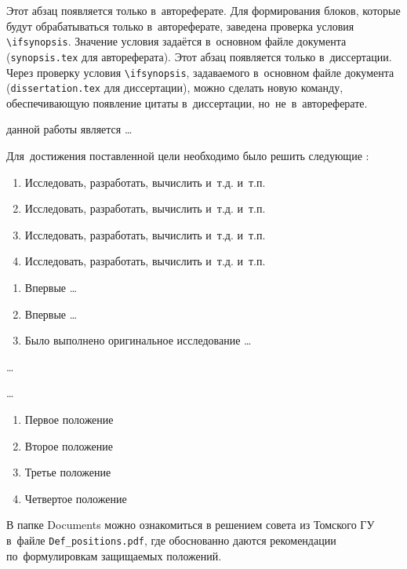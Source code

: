\ifsynopsis
Этот абзац появляется только в~автореферате.
Для формирования блоков, которые будут обрабатываться только в~автореферате,
заведена проверка условия \verb!\!\verb!ifsynopsis!.
Значение условия задаётся в~основном файле документа (\verb!synopsis.tex! для
автореферата).
\else
Этот абзац появляется только в~диссертации.
Через проверку условия \verb!\!\verb!ifsynopsis!, задаваемого в~основном файле
документа (\verb!dissertation.tex! для диссертации), можно сделать новую
команду, обеспечивающую появление цитаты в~диссертации, но~не~в~автореферате.
\fi


{\aim} данной работы является \ldots

Для~достижения поставленной цели необходимо было решить следующие {\tasks}:
\begin{enumerate}[beginpenalty=10000] %
  \item Исследовать, разработать, вычислить и~т.\:д. и~т.\:п.
  \item Исследовать, разработать, вычислить и~т.\:д. и~т.\:п.
  \item Исследовать, разработать, вычислить и~т.\:д. и~т.\:п.
  \item Исследовать, разработать, вычислить и~т.\:д. и~т.\:п.
\end{enumerate}


{\novelty}
\begin{enumerate}[beginpenalty=10000] %
  \item Впервые \ldots
  \item Впервые \ldots
  \item Было выполнено оригинальное исследование \ldots
\end{enumerate}

{\influence} \ldots

{\methods} \ldots

{}
\begin{enumerate}[beginpenalty=10000] %
  \item Первое положение
  \item Второе положение
  \item Третье положение
  \item Четвертое положение
\end{enumerate}
В папке Documents можно ознакомиться в решением совета из Томского ГУ
в~файле \verb+Def_positions.pdf+, где обоснованно даются рекомендации
по~формулировкам защищаемых положений.

